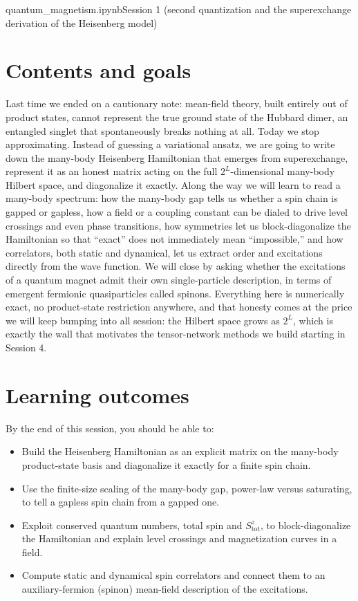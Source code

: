 \documentclass[all_sessions.tex]{subfiles}
\begin{document}
%
  {quantum\_magnetism.ipynb}{Session 1 (second quantization and the superexchange derivation of the
  Heisenberg model)}

\section*{Contents and goals}
Last time we ended on a cautionary note: mean-field theory, built entirely out of product states,
cannot represent the true ground state of the Hubbard dimer, an entangled singlet that spontaneously
breaks nothing at all. Today we stop approximating. Instead of guessing a variational ansatz, we are
going to write down the many-body Heisenberg Hamiltonian that emerges from superexchange, represent it
as an honest matrix acting on the full $2^L$-dimensional many-body Hilbert space, and diagonalize it
exactly. Along the way we will learn to read a many-body spectrum: how the many-body gap tells us
whether a spin chain is gapped or gapless, how a field or a coupling constant can be dialed to drive
level crossings and even phase transitions, how symmetries let us block-diagonalize the Hamiltonian so
that ``exact'' does not immediately mean ``impossible,'' and how correlators, both static and
dynamical, let us extract order and excitations directly from the wave function. We will close by
asking whether the excitations of a quantum magnet admit their own single-particle description, in
terms of emergent fermionic quasiparticles called spinons. Everything here is numerically exact, no
product-state restriction anywhere, and that honesty comes at the price we will keep bumping into all
session: the Hilbert space grows as $2^L$, which is exactly the wall that motivates the tensor-network
methods we build starting in Session 4.

\section*{Learning outcomes}
By the end of this session, you should be able to:
\begin{itemize}[nosep]
  \item Build the Heisenberg Hamiltonian as an explicit matrix on the many-body product-state
    basis and diagonalize it exactly for a finite spin chain.
  \item Use the finite-size scaling of the many-body gap, power-law versus saturating, to tell a
    gapless spin chain from a gapped one.
  \item Exploit conserved quantum numbers, total spin and $S_{\mathrm{tot}}^z$, to
    block-diagonalize the Hamiltonian and explain level crossings and magnetization curves in a
    field.
  \item Compute static and dynamical spin correlators and connect them to an auxiliary-fermion
    (spinon) mean-field description of the excitations.
\end{itemize}
\end{document}
